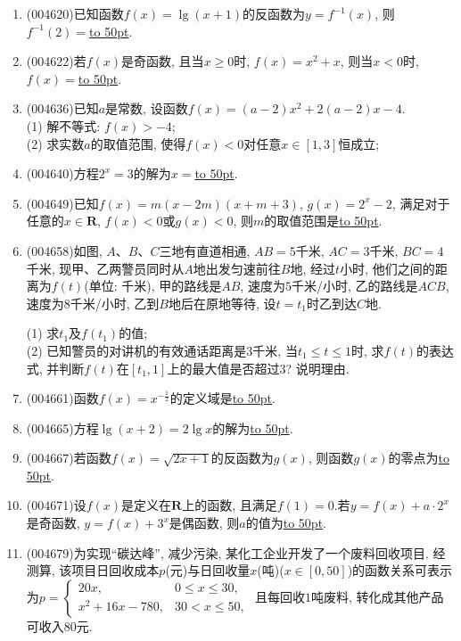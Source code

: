 \documentclass[10pt,a4paper]{article}
\newcommand{\blank}[1]{\underline{\hbox to #1pt{}}}
\begin{document}
\begin{enumerate}[1.]
\item {\tiny (004620)}已知函数$f(x)=\lg (x+1)$的反函数为$y=f^{-1}(x)$, 则$f^{-1}(2)=$\blank{50}.
\item {\tiny (004622)}若$f(x)$是奇函数, 且当$x\ge 0$时, $f(x)=x^2+x$, 则当$x<0$时, $f(x)=$\blank{50}.
\item {\tiny (004636)}已知$a$是常数, 设函数$f(x)=(a-2)x^2+2(a-2)x-4$.\\
(1) 解不等式: $f(x)>-4$;\\
(2) 求实数$a$的取值范围, 使得$f(x)<0$对任意$x\in [1,3]$恒成立;
\item {\tiny (004640)}方程$2^x=3$的解为$x=$\blank{50}.
\item {\tiny (004649)}已知$f(x)=m(x-2m)(x+m+3)$, $g(x)=2^x-2$, 满足对于任意的$x\in \mathbf{R}$, $f(x)<0$或$g(x)<0$, 则$m$的取值范围是\blank{50}.
\item {\tiny (004658)}如图, $A$、$B$、$C$三地有直道相通, $AB=5$千米, $AC=3$千米, $BC=4$千米, 现甲、乙两警员同时从$A$地出发匀速前往$B$地, 经过$t$小时, 他们之间的距离为$f(t)$(单位: 千米), 甲的路线是$AB$, 速度为$5$千米/小时, 乙的路线是$ACB$, 速度为$8$千米/小时, 乙到$B$地后在原地等待, 设$t=t_1$时乙到达$C$地.
\begin{center}
\end{center}
(1) 求$t_1$及$f(t_1)$的值;\\
(2) 已知警员的对讲机的有效通话距离是$3$千米, 当$t_1\le t\le 1$时, 求$f(t)$的表达式, 并判断$f(t)$在$[t_1,1]$上的最大值是否超过$3$? 说明理由.
\item {\tiny (004661)}函数$f(x)={x^{-\frac 12}}$的定义域是\blank{50}.
\item {\tiny (004665)}方程$\lg (x+2)=2\lg x$的解为\blank{50}.
\item {\tiny (004667)}若函数$f(x)=\sqrt{2x+1}$的反函数为$g(x)$, 则函数$g(x)$的零点为\blank{50}.
\item {\tiny (004671)}设$f(x)$是定义在$\mathbf{R}$上的函数, 且满足$f(1)=0$.若$y=f(x)+a\cdot 2^x$是奇函数, $y=f(x)+3^x$是偶函数, 则$a$的值为\blank{50}.
\item {\tiny (004679)}为实现``碳达峰'', 减少污染, 某化工企业开发了一个废料回收项目. 经测算, 该项目日回收成本$p$(元)与日回收量$x$(吨)($x\in [0,50]$)的函数关系可表示为$p=\begin{cases}20x, & 0\le x\le 30,  \\ x^2+16x-780, & 30<x \le 50,  \end{cases}$ 且每回收$1$吨废料, 转化成其他产品可收入$80$元.\\

\end{enumerate}
\end{document}
